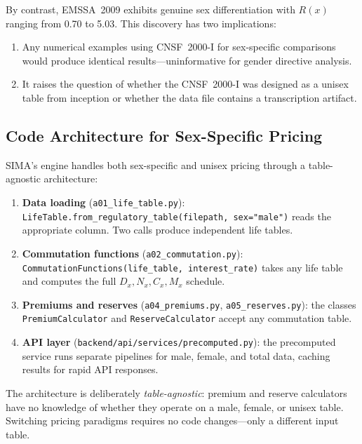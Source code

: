 \documentclass[12pt,a4paper]{article}
\begin{document}
By contrast, EMSSA~2009 exhibits genuine sex differentiation with $R(x)$ ranging
from 0.70 to 5.03. This discovery has two implications:
\begin{enumerate}
  \item Any numerical examples using CNSF~2000-I for sex-specific comparisons
        would produce identical results---uninformative for gender directive analysis.
  \item It raises the question of whether the CNSF~2000-I was designed as a
        unisex table from inception or whether the data file contains a
        transcription artifact.
\end{enumerate}

\subsection{Code Architecture for Sex-Specific Pricing}
\label{subsec:code-architecture}

SIMA's engine handles both sex-specific and unisex pricing through a
table-agnostic architecture:

\begin{enumerate}\footnotesize\sloppy
  \item \textbf{Data loading} (\texttt{a01\_life\_table.py}):
        \texttt{LifeTable.from\_regulatory\_table(filepath, sex="male")}
        reads the appropriate column. Two calls produce independent life tables.

  \item \textbf{Commutation functions} (\texttt{a02\_commutation.py}):
        \texttt{CommutationFunctions(life\_table, interest\_rate)}
        takes any life table and computes the full $D_x, N_x, C_x, M_x$ schedule.

  \item \textbf{Premiums and reserves} (\texttt{a04\_premiums.py},
        \texttt{a05\_reserves.py}): the classes \texttt{PremiumCalculator}
        and \texttt{ReserveCalculator} accept any commutation table.

  \item \textbf{API layer}
        (\texttt{backend/api/services/precomputed.py}):
        the precomputed service runs separate pipelines for male, female,
        and total data, caching results for rapid API responses.
\end{enumerate}

The architecture is deliberately \emph{table-agnostic}: premium and reserve
calculators have no knowledge of whether they operate on a male, female, or
unisex table. Switching pricing paradigms requires no code changes---only a
different input table.
\end{document}
